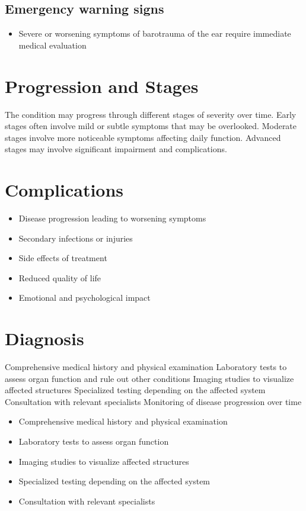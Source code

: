 \subsection{Emergency warning signs}
\begin{itemize}[noitemsep]
  \item Severe or worsening symptoms of barotrauma of the ear require immediate medical evaluation
\end{itemize}
\section{Progression and Stages}
The condition may progress through different stages of severity over time. Early stages often involve mild or subtle symptoms that may be overlooked. Moderate stages involve more noticeable symptoms affecting daily function. Advanced stages may involve significant impairment and complications.
\section{Complications}
\begin{itemize}[noitemsep]
  \item Disease progression leading to worsening symptoms
  \item Secondary infections or injuries
  \item Side effects of treatment
  \item Reduced quality of life
  \item Emotional and psychological impact
\end{itemize}
\section{Diagnosis}
Comprehensive medical history and physical examination Laboratory tests to assess organ function and rule out other conditions Imaging studies to visualize affected structures Specialized testing depending on the affected system Consultation with relevant specialists Monitoring of disease progression over time

\begin{itemize}[noitemsep]
  \item Comprehensive medical history and physical examination
  \item Laboratory tests to assess organ function
  \item Imaging studies to visualize affected structures
  \item Specialized testing depending on the affected system
  \item Consultation with relevant specialists
\end{itemize}
